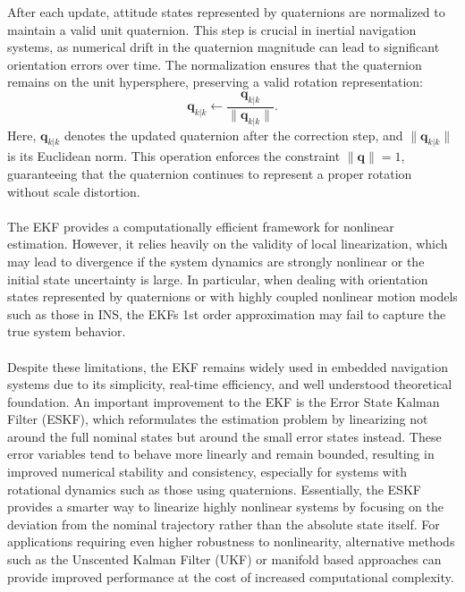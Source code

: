 After each update, attitude states represented by quaternions are normalized to maintain a valid unit quaternion. This step is crucial in inertial navigation systems, as numerical drift in the quaternion magnitude can lead to significant orientation errors over time. The normalization ensures that the quaternion remains on the unit hypersphere, preserving a valid rotation representation:
$$
    \mathbf{q}_{k|k} \leftarrow \frac{\mathbf{q}_{k|k}}{\|\mathbf{q}_{k|k}\|}.
$$
Here, $\mathbf{q}_{k|k}$ denotes the updated quaternion after the correction step, and $\|\mathbf{q}_{k|k}\|$ is its Euclidean norm. This operation enforces the constraint $\|\mathbf{q}\| = 1$, guaranteeing that the quaternion continues to represent a proper rotation without scale distortion.
\\ \\
The EKF provides a computationally efficient framework for nonlinear estimation. However, it relies heavily on the validity of local linearization, which may lead to divergence if the system dynamics are strongly nonlinear or the initial state uncertainty is large. In particular, when dealing with orientation states represented by quaternions or with highly coupled nonlinear motion models such as those in INS, the EKFs 1st order approximation may fail to capture the true system behavior.  
\\ \\
Despite these limitations, the EKF remains widely used in embedded navigation systems due to its simplicity, real-time efficiency, and well understood theoretical foundation. An important improvement to the EKF is the Error State Kalman Filter (ESKF), which reformulates the estimation problem by linearizing not around the full nominal states but around the small error states instead. These error variables tend to behave more linearly and remain bounded, resulting in improved numerical stability and consistency, especially for systems with rotational dynamics such as those using quaternions. Essentially, the ESKF provides a smarter way to linearize highly nonlinear systems by focusing on the deviation from the nominal trajectory rather than the absolute state itself. For applications requiring even higher robustness to nonlinearity, alternative methods such as the Unscented Kalman Filter (UKF) or manifold based approaches can provide improved performance at the cost of increased computational complexity.

